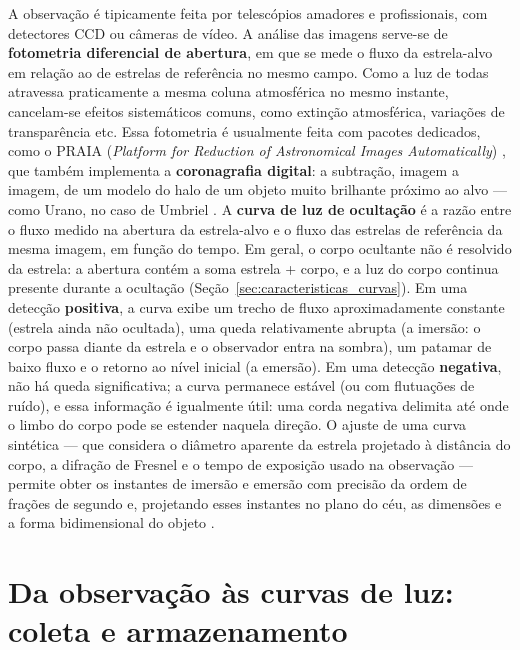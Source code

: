 A observação é tipicamente feita por telescópios amadores e profissionais, com detectores CCD ou câmeras de vídeo. A análise das imagens serve-se de \textbf{fotometria diferencial de abertura}, em que se mede o fluxo da estrela-alvo em relação ao de estrelas de referência no mesmo campo. Como a luz de todas atravessa praticamente a mesma coluna atmosférica no mesmo instante, cancelam-se efeitos sistemáticos comuns, como extinção atmosférica, variações de transparência etc. Essa fotometria é usualmente feita com pacotes dedicados, como o PRAIA (\textit{Platform for Reduction of Astronomical Images Automatically}) \citep{AssafinPRAIA}, que também implementa a \textbf{coronagrafia digital}: a subtração, imagem a imagem, de um modelo do halo de um objeto muito brilhante próximo ao alvo --- como Urano, no caso de Umbriel \citep{Assafin2023}. A \textbf{curva de luz de ocultação} é a razão entre o fluxo medido na abertura da estrela-alvo e o fluxo das estrelas de referência da mesma imagem, em função do tempo. Em geral, o corpo ocultante não é resolvido da estrela: a abertura contém a soma estrela + corpo, e a luz do corpo continua presente durante a ocultação (Seção~\ref{sec:caracteristicas_curvas}). Em uma detecção \textbf{positiva}, a curva exibe um trecho de fluxo aproximadamente constante (estrela ainda não ocultada), uma queda relativamente abrupta (a imersão: o corpo passa diante da estrela e o observador entra na sombra), um patamar de baixo fluxo e o retorno ao nível inicial (a emersão). Em uma detecção \textbf{negativa}, não há queda significativa; a curva permanece estável (ou com flutuações de ruído), e essa informação é igualmente útil: uma corda negativa delimita até onde o limbo do corpo pode se estender naquela direção. O ajuste de uma curva sintética --- que considera o diâmetro aparente da estrela projetado à distância do corpo, a difração de Fresnel e o tempo de exposição usado na observação --- permite obter os instantes de imersão e emersão com precisão da ordem de frações de segundo e, projetando esses instantes no plano do céu, as dimensões e a forma bidimensional do objeto \citep{Ortiz2020, SORA2022}.



\section{Da observação às curvas de luz: coleta e armazenamento}
\label{sec:coleta_armazenamento}

